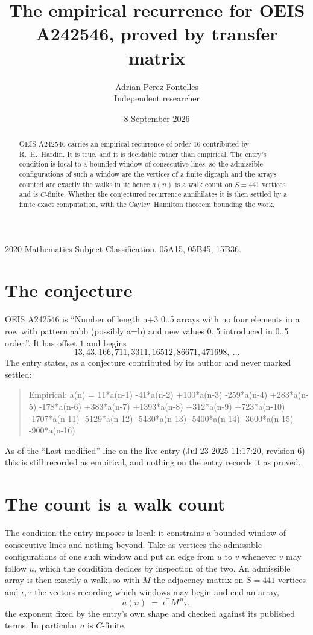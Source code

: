 \documentclass[11pt,a4paper]{article}
\title{The empirical recurrence for OEIS A242546, proved by transfer matrix}
\author{Adrian Perez Fontelles\\ \small Independent researcher}
\date{8 September 2026}
\theoremstyle{plain}
\theoremstyle{definition}
\begin{document}
\maketitle

\begin{abstract}
OEIS A242546 carries an empirical recurrence of order $16$ contributed by R.~H.~Hardin. It is
true, and it is decidable rather than empirical. The entry's condition is local to a bounded window of consecutive lines, so
the admissible configurations of such a window are the vertices of a finite digraph and the
arrays counted are exactly the walks in it; hence $a(n)$ is a walk count on $S=441$ vertices
and is $C$-finite. Whether the conjectured recurrence annihilates it is then settled by a
finite exact computation, with the Cayley--Hamilton theorem bounding the work.
\end{abstract}

\noindent\small 2020 Mathematics Subject Classification. 05A15, 05B45, 15B36.\normalsize

\section{The conjecture}

OEIS A242546 is ``Number of length n+3 0..5 arrays with no four elements in a row with pattern aabb (possibly a=b) and new values 0..5 introduced in 0..5 order.''. It has offset $1$ and begins
\[
13, 43, 166, 711, 3311, 16512, 86671, 471698,\ \dots
\]
The entry states, as a conjecture contributed by its author and never marked settled:
\begin{quote}
Empirical: a(n) = 11*a(n-1) -41*a(n-2) +100*a(n-3) -259*a(n-4) +283*a(n-5) -178*a(n-6) +383*a(n-7) +1393*a(n-8) +312*a(n-9) +723*a(n-10) -1707*a(n-11) -5129*a(n-12) -5430*a(n-13) -5400*a(n-14) -3600*a(n-15) -900*a(n-16)
\end{quote}
As of the ``Last modified'' line on the live entry (Jul 23 2025 11:17:20, revision 6) this is still
recorded as empirical, and nothing on the entry records it as proved.

\section{The count is a walk count}

The condition the entry imposes is local: it constrains a bounded window of consecutive lines and nothing beyond. Take as
vertices the admissible configurations of one such window and put an edge from $u$ to $v$
whenever $v$ may follow $u$, which the condition decides by inspection of the two. An
admissible array is then exactly a walk, so with $M$ the adjacency matrix on $S=441$ vertices
and $\iota,\tau$ the vectors recording which windows may begin and end an array,
\[
a(n)\;=\;\iota^{\!\top}M^{\,n}\tau ,
\]
the exponent fixed by the entry's own shape and checked against its published terms. In
particular $a$ is $C$-finite.
\end{document}
